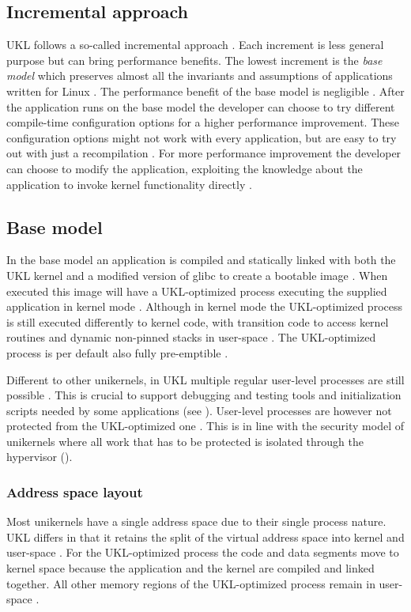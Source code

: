 \documentclass[10pt,twocolumn,a4paper]{article}
\begin{document}
  \subsection{Incremental approach}
    UKL follows a so-called incremental approach \cite{raza23}. 
    Each increment is less general purpose but can bring performance benefits.
    The lowest increment is the \textit{base model} which preserves almost all the 
    invariants and assumptions of applications written for Linux \cite{raza23}.
    The performance benefit of the base model is negligible \cite{raza23}.
    After the application runs on the base model the developer can choose to try different
    compile-time configuration options for a higher performance improvement.
    These configuration options might not work with every application, but are easy to try out
    with just a recompilation \cite{raza23}.
    For more performance improvement the developer can choose to modify the application, exploiting the
    knowledge about the application to invoke kernel functionality directly \cite{raza23}.

  \subsection{Base model}\label{sec:base-model}
    In the base model an application is compiled and statically linked with both 
    the UKL kernel and a modified version of glibc to create a bootable image \cite{raza23}.
    When executed this image will have a UKL-optimized process executing the supplied 
    application in kernel mode \cite{raza23}.
    Although in kernel mode the UKL-optimized process is still executed differently to kernel code,
    with transition code to access kernel routines and dynamic non-pinned stacks in user-space \cite{raza23}.
    The UKL-optimized process is per default also fully pre-emptible \cite{raza23}.

    Different to other unikernels, in UKL multiple regular user-level processes are still possible \cite{raza23}.
    This is crucial to support debugging and testing tools and initialization scripts needed by
    some applications (see ).
    User-level processes are however not protected from the UKL-optimized one \cite{raza23}.
    This is in line with the security model of unikernels where all work that has to 
    be protected is isolated through the hypervisor ().

    \subsubsection{Address space layout}
      Most unikernels have a single address space due to their single process nature.
      UKL differs in that it retains the split of the virtual address space into kernel 
      and user-space \cite{raza23}.
      For the UKL-optimized process the code and data segments move to kernel space because
      the application and the kernel are compiled and linked together.
      All other memory regions of the UKL-optimized process remain in user-space \cite{raza23}.
\end{document}
